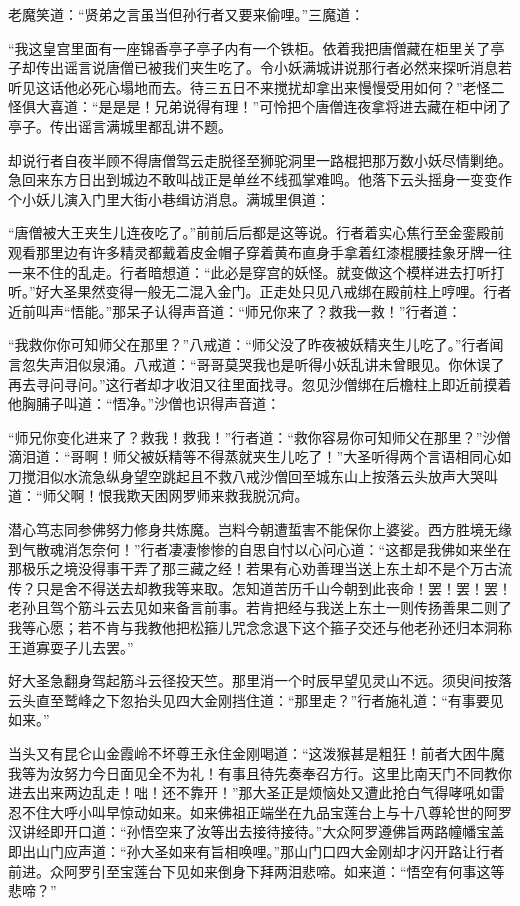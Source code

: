 \documentclass[12pt,UTF8]{ctexbook}
\begin{document}
{	老魔笑道：“贤弟之言虽当但孙行者又要来偷哩。”三魔道：
	
	“我这皇宫里面有一座锦香亭子亭子内有一个铁柜。依着我把唐僧藏在柜里关了亭子却传出谣言说唐僧已被我们夹生吃了。令小妖满城讲说那行者必然来探听消息若听见这话他必死心塌地而去。待三五日不来搅扰却拿出来慢慢受用如何？”老怪二怪俱大喜道：“是是是！兄弟说得有理！”可怜把个唐僧连夜拿将进去藏在柜中闭了亭子。传出谣言满城里都乱讲不题。
	
	却说行者自夜半顾不得唐僧驾云走脱径至狮驼洞里一路棍把那万数小妖尽情剿绝。急回来东方日出到城边不敢叫战正是单丝不线孤掌难鸣。他落下云头摇身一变变作个小妖儿演入门里大街小巷缉访消息。满城里俱道：
	
	“唐僧被大王夹生儿连夜吃了。”前前后后都是这等说。行者着实心焦行至金銮殿前观看那里边有许多精灵都戴着皮金帽子穿着黄布直身手拿着红漆棍腰挂象牙牌一往一来不住的乱走。行者暗想道：“此必是穿宫的妖怪。就变做这个模样进去打听打听。”好大圣果然变得一般无二混入金门。正走处只见八戒绑在殿前柱上哼哩。行者近前叫声“悟能。”那呆子认得声音道：“师兄你来了？救我一救！”行者道：
	
	“我救你你可知师父在那里？”八戒道：“师父没了昨夜被妖精夹生儿吃了。”行者闻言忽失声泪似泉涌。八戒道：“哥哥莫哭我也是听得小妖乱讲未曾眼见。你休误了再去寻问寻问。”这行者却才收泪又往里面找寻。忽见沙僧绑在后檐柱上即近前摸着他胸脯子叫道：“悟净。”沙僧也识得声音道：
	
	“师兄你变化进来了？救我！救我！”行者道：“救你容易你可知师父在那里？”沙僧滴泪道：“哥啊！师父被妖精等不得蒸就夹生儿吃了！”大圣听得两个言语相同心如刀搅泪似水流急纵身望空跳起且不救八戒沙僧回至城东山上按落云头放声大哭叫道：“师父啊！恨我欺天困网罗师来救我脱沉疴。
	
	潜心笃志同参佛努力修身共炼魔。岂料今朝遭蜇害不能保你上婆娑。西方胜境无缘到气散魂消怎奈何！”行者凄凄惨惨的自思自忖以心问心道：“这都是我佛如来坐在那极乐之境没得事干弄了那三藏之经！若果有心劝善理当送上东土却不是个万古流传？只是舍不得送去却教我等来取。怎知道苦历千山今朝到此丧命！罢！罢！罢！老孙且驾个筋斗云去见如来备言前事。若肯把经与我送上东土一则传扬善果二则了我等心愿；若不肯与我教他把松箍儿咒念念退下这个箍子交还与他老孙还归本洞称王道寡耍子儿去罢。”
	
	好大圣急翻身驾起筋斗云径投天竺。那里消一个时辰早望见灵山不远。须臾间按落云头直至鹫峰之下忽抬头见四大金刚挡住道：“那里走？”行者施礼道：“有事要见如来。”
	
	当头又有昆仑山金霞岭不坏尊王永住金刚喝道：“这泼猴甚是粗狂！前者大困牛魔我等为汝努力今日面见全不为礼！有事且待先奏奉召方行。这里比南天门不同教你进去出来两边乱走！咄！还不靠开！”那大圣正是烦恼处又遭此抢白气得哮吼如雷忍不住大呼小叫早惊动如来。如来佛祖正端坐在九品宝莲台上与十八尊轮世的阿罗汉讲经即开口道：“孙悟空来了汝等出去接待接待。”大众阿罗遵佛旨两路幢幡宝盖即出山门应声道：“孙大圣如来有旨相唤哩。”那山门口四大金刚却才闪开路让行者前进。众阿罗引至宝莲台下见如来倒身下拜两泪悲啼。如来道：“悟空有何事这等悲啼？”
	
}
\end{document}
